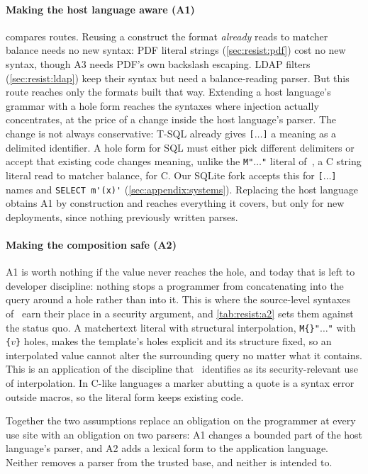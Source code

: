 \paragraph{Making the host language aware (A1)}
 compares routes.
Reusing a construct the format \emph{already} reads to matcher balance needs no
new syntax:
PDF literal strings (\cref{sec:resist:pdf}) cost no new syntax, though A3 needs
PDF's own backslash escaping.
LDAP filters (\cref{sec:resist:ldap}) keep their syntax but need a
balance-reading parser.
But this route reaches only the formats built that way.
Extending a host language's grammar with a hole form reaches the syntaxes where injection
actually concentrates, at the price of a change inside the host language's parser.
The change is not always conservative: T-SQL already gives
\verb|[|$\dots$\verb|]| a meaning as a delimited identifier.
A hole form for SQL must either pick different delimiters or accept that
existing code changes meaning, unlike the \verb|M"|$\dots$\verb|"| literal
of~\cite{matchertext}, a C string literal read to matcher balance, for C.
Our SQLite fork accepts this for \verb|[|$\dots$\verb|]| names and
\verb|SELECT m'(x)'| (\cref{sec:appendix:systems}).
Replacing the host language obtains A1 by construction and reaches everything it
covers, but only for new deployments, since nothing previously written parses.


\paragraph{Making the composition safe (A2)}
A1 is worth nothing if the value never reaches the hole, and today that is left to
developer discipline: nothing stops a programmer from concatenating into the query
around a hole rather than into it.
This is where the source-level syntaxes of~\cite{matchertext} earn their place in
a security argument, and \cref{tab:resist:a2} sets them against the status quo.
A matchertext literal with structural interpolation, \verb|M{}"|$\dots$\verb|"|
with \verb|{|$v$\verb|}| holes, makes the template's holes
explicit and its structure fixed, so an interpolated value cannot alter the
surrounding query no matter what it contains.
This is an application of the discipline that~\cite{matchertext} identifies as its
security-relevant use of interpolation.
In C-like languages a marker abutting a quote is a syntax error outside
macros, so the literal form keeps existing code.


Together the two assumptions replace an obligation on the programmer at every use
site with an obligation on two parsers: A1 changes a bounded part of the host language's
parser, and A2 adds a lexical form to the application language.
Neither removes a parser from the trusted base, and neither is intended to.
